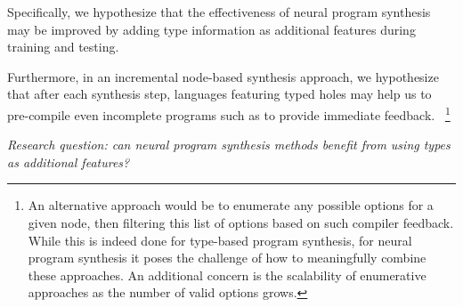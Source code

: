 \documentclass{article}
\begin{document}
Specifically, we hypothesize that the effectiveness of neural program synthesis may be improved by
adding type information as additional features during training and testing.

Furthermore, in an incremental node-based synthesis approach, we hypothesize that after each synthesis step,
languages featuring typed holes may help us to pre-compile even incomplete programs such as to provide immediate feedback.%
~\footnote{
    An alternative approach would be to enumerate any possible options for a given node,
    then filtering this list of options based on such compiler feedback.
    While this is indeed done for type-based program synthesis,
    for neural program synthesis it poses the challenge of how to meaningfully combine these approaches.
    An additional concern is the scalability of enumerative approaches as the number of valid options grows.
}



\emph{Research question: can neural program synthesis methods benefit from using types as additional features?}
\end{document}

